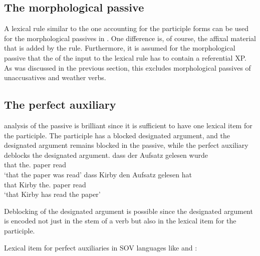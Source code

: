 \subsection{The morphological passive}

A lexical rule similar to the one accounting for the participle forms can be used for the
morphological passives in . One difference is, of course, the affixal material that is added by
the rule. Furthermore, it is assumed for the morphological passive that the \da of the input to the lexical rule has to contain
a referential XP. As was discussed in the previous section, this excludes morphological passives of
unaccusatives and weather verbs. 





\subsection{The perfect auxiliary}
\label{sec-perfect}

 analysis of the passive is brilliant since it is sufficient to have one lexical
item for the participle. The participle has a blocked designated argument, and the designated
argument remains blocked in the passive, while the perfect auxiliary deblocks the designated 
argument. 
\eal
\ex
\gll dass der        Aufsatz gelesen wurde\\
     that the.\NOM{} paper   read    \AUX\\
\glt `that the paper was read'
\ex
\gll dass Kirby den Aufsatz gelesen hat\\
     that Kirby the.\ACC{} paper read \AUX\\
\glt `that Kirby has read the paper'
\zl

\noindent
Deblocking of the designated argument is possible since the designated argument is encoded not just in the stem of a verb
but also in the lexical item for the participle.   

\ea
Lexical item for perfect auxiliaries in SOV languages like  and :\\
\z



